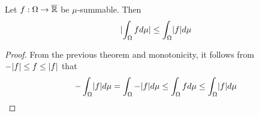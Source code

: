 \begin{cor}
Let $f: \Omega \to \overline{\mathbb{R}}$ be $\mu$-summable. Then
\begin{align*}
  \abs{\int_{\Omega} f d \mu} \leq \int_{\Omega} \abs{f} d \mu
\end{align*}
\end{cor}
\begin{proof}
  From the previous theorem and monotonicity, it follows from $- \vert f\vert \leq f \leq \vert f\vert$ that
  \begin{align*}
    - \int_{\Omega} \abs{f} d \mu = \int_{\Omega} - \abs{f} d \mu \leq \int_{\Omega} f d \mu \leq \int_{\Omega} \abs{f} d \mu
  \end{align*}
\end{proof}

